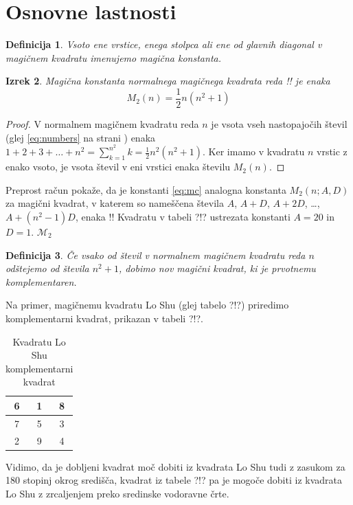 \documentclass[a4paper,12pt]{article}
\newtheorem{izrek}{Izrek}[section]
\newtheorem{definicija}[izrek]{Definicija}
\begin{document}
\newpage

\section{Osnovne lastnosti}

\begin{definicija}
      Vsoto ene vrstice, enega stolpca ali ene od glavnih diagonal
      v magičnem kvadratu imenujemo \emph{magična konstanta}.
\end{definicija}

\begin{izrek}
	Magična konstanta normalnega magičnega kvadrata reda !!
   je enaka
   \begin{equation}
      \label{eq:mc}
      M_2(n) = \frac{1}{2} n(n^2+1)
   \end{equation}
\end{izrek}



\begin{proof}
	   V normalnem magičnem kvadratu reda $n$ je vsota vseh nastopajočih
   števil (glej \eqref{eq:numbers} na strani \pageref{eq:numbers}) enaka
   $1+2+3+\dots+n^2=\sum_{k=1}^{n^2}k=\frac{1}{2}n^2(n^2+1)$. Ker imamo
   v kvadratu $n$ vrstic z enako vsoto, je vsota števil v eni vrstici
   enaka številu $M_2(n)$.
\end{proof}

Preprost račun pokaže, da je konstanti \eqref{eq:mc} analogna konstanta
$M_2(n;A,D)$ za magični kvadrat, v katerem so nameščena števila
$A$, $A+D$, $A+2D$, \dots, $A+(n^2-1)D$, enaka 
!!
Kvadratu v tabeli ?!? ustrezata konstanti $A=20$ in $D=1$.
\( \mathcal{M}_2 \)
\newcommand{\m}{\mathcal{M}_2}

\begin{definicija}
      Če vsako od števil v normalnem magičnem kvadratu reda $n$ odštejemo
      od števila $n^2+1$, dobimo nov magični kvadrat, ki je prvotnemu
      \emph{komplementaren}.
\end{definicija}

Na primer, magičnemu kvadratu Lo Shu (glej tabelo ?!?) priredimo
komplementarni kvadrat, prikazan v tabeli ?!?.

\begin{table}
   \centering
   \label{table:closhu}
   \caption{Kvadratu Lo Shu komplementarni kvadrat}
\begin{tabular}{|c|c|c|}
   \hline
		   6 & 1 & 8 \\\hline
   7 & 5 & 3 \\\hline
   2 & 9 & 4 \\\hline

\end{tabular}
\end{table}
Vidimo, da je dobljeni kvadrat moč dobiti iz kvadrata Lo Shu tudi z zasukom za
180 stopinj okrog središča, kvadrat iz tabele ?!? pa je mogoče dobiti
iz kvadrata Lo Shu z zrcaljenjem preko sredinske vodoravne črte.
\end{document}
